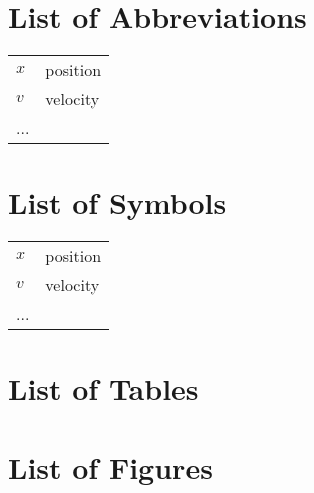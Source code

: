
\newpage
{}
 



\newpage
{}
\section*{List of Abbreviations}

\begin{tabular}{ll}
$x$ & position\\
$v$ & velocity\\
...\\
\end{tabular}


\newpage
{}
\section*{List of Symbols}

\begin{tabular}{ll}
$x$ & position\\
$v$ & velocity\\
...\\
\end{tabular}


\newpage
{}
\section*{List of Tables}
\listoftables


\newpage
{}
\section*{List of Figures}
\listoffigures

